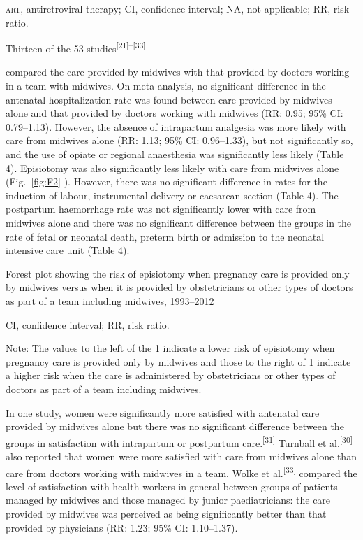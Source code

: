 \documentclass{article}
\begin{document}
\textsc{art}, antiretroviral therapy; CI, confidence interval; NA, not applicable; RR,
risk ratio.

Thirteen of the 53 studies\textsuperscript{[}\textsuperscript{21}\textsuperscript{]}\textsuperscript{–}\textsuperscript{[}\textsuperscript{33}\textsuperscript{]}

compared the care provided by midwives with that provided by doctors working in
a team with
midwives. On meta-analysis, no significant difference in the antenatal
hospitalization rate was
found between care provided by midwives alone and that provided by doctors
working with midwives
(RR: 0.95; 95\% CI: 0.79–1.13). However, the absence of intrapartum analgesia
was more likely
with care from midwives alone (RR: 1.13; 95\% CI: 0.96–1.33), but not
significantly so, and
the use of opiate or regional anaesthesia was significantly less likely (Table
4). Episiotomy was also significantly less likely with care from
midwives alone (Fig.~\ref{fig:F2}
). However, there was no
significant difference in rates for the induction of labour, instrumental
delivery or caesarean
section (Table 4). The postpartum haemorrhage rate was
not significantly lower with care from midwives alone and there was no
significant difference
between the groups in the rate of fetal or neonatal death, preterm birth or
admission to the
neonatal intensive care unit (Table 4).

Forest plot showing the risk of episiotomy when pregnancy care is provided only
by midwives
versus when it is provided by obstetricians or other types of doctors as part of
a team including
midwives, 1993–2012

CI, confidence interval; RR, risk ratio.

Note: The values to the left of the 1 indicate a lower risk of episiotomy when
pregnancy care is
provided only by midwives and those to the right of 1 indicate a higher risk
when the care is
administered by obstetricians or other types of doctors as part of a team
including midwives.

In one study, women were significantly more satisfied with antenatal care
provided by midwives
alone but there was no significant difference between the groups in satisfaction
with intrapartum or
postpartum care.\textsuperscript{[}\textsuperscript{31}\textsuperscript{]}
Turnball et al.\textsuperscript{[}\textsuperscript{30}\textsuperscript{]}
also reported that women were more satisfied with
care from midwives alone than care from doctors working with midwives in a team.
Wolke et al.\textsuperscript{[}\textsuperscript{33}\textsuperscript{]}
compared the level of satisfaction with health
workers in general between groups of patients managed by midwives and those
managed by junior
paediatricians: the care provided by midwives was perceived as being
significantly better than that
provided by physicians (RR: 1.23; 95\% CI: 1.10–1.37).
\end{document}
